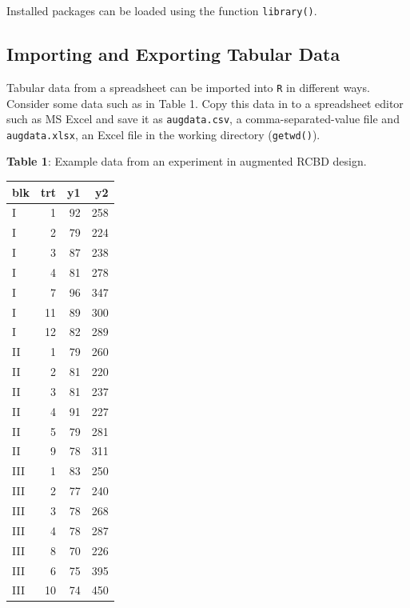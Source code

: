 \begin{Shaded}
\begin{Highlighting}[]
\end{Highlighting}
\end{Shaded}

Installed packages can be loaded using the function \texttt{library()}.

\begin{Shaded}
\begin{Highlighting}[]
\end{Highlighting}
\end{Shaded}

\hypertarget{impexp}{%
\subsection{Importing and Exporting Tabular Data}\label{impexp}}

Tabular data from a spreadsheet can be imported into \texttt{R} in
different ways. Consider some data such as in Table 1. Copy this data in
to a spreadsheet editor such as MS Excel and save it as
\texttt{augdata.csv}, a comma-separated-value file and
\texttt{augdata.xlsx}, an Excel file in the working directory
(\texttt{getwd()}).

\begin{center}
                \textbf{Table 1}: Example data from an experiment in augmented RCBD design.
                \end{center}

\begin{longtable}[]{@{}lrrr@{}}
\toprule
blk & trt & y1 & y2\tabularnewline
\midrule
\endhead
I & 1 & 92 & 258\tabularnewline
I & 2 & 79 & 224\tabularnewline
I & 3 & 87 & 238\tabularnewline
I & 4 & 81 & 278\tabularnewline
I & 7 & 96 & 347\tabularnewline
I & 11 & 89 & 300\tabularnewline
I & 12 & 82 & 289\tabularnewline
II & 1 & 79 & 260\tabularnewline
II & 2 & 81 & 220\tabularnewline
II & 3 & 81 & 237\tabularnewline
II & 4 & 91 & 227\tabularnewline
II & 5 & 79 & 281\tabularnewline
II & 9 & 78 & 311\tabularnewline
III & 1 & 83 & 250\tabularnewline
III & 2 & 77 & 240\tabularnewline
III & 3 & 78 & 268\tabularnewline
III & 4 & 78 & 287\tabularnewline
III & 8 & 70 & 226\tabularnewline
III & 6 & 75 & 395\tabularnewline
III & 10 & 74 & 450\tabularnewline
\bottomrule
\end{longtable}

